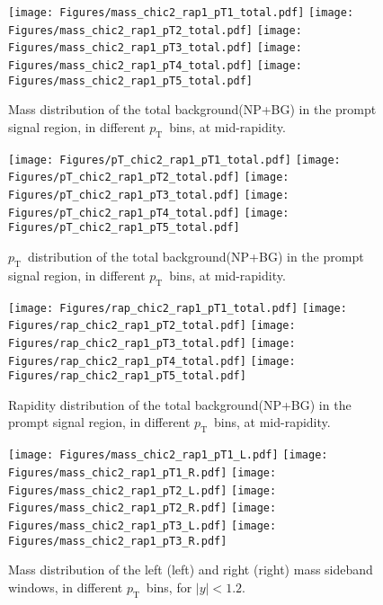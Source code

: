 \documentclass[12pt]{article}
\newcommand{\pt}{$p_{\mathrm{T}}$}
\begin{document}
\begin{figure}[htbp]
\centering
\texttt{[image: Figures/mass\_chic2\_rap1\_pT1\_total.pdf]}
\texttt{[image: Figures/mass\_chic2\_rap1\_pT2\_total.pdf]}
\texttt{[image: Figures/mass\_chic2\_rap1\_pT3\_total.pdf]}
\texttt{[image: Figures/mass\_chic2\_rap1\_pT4\_total.pdf]}
\texttt{[image: Figures/mass\_chic2\_rap1\_pT5\_total.pdf]}
\caption{Mass distribution of the total
  background(NP+BG) in the prompt signal region,
   in different \pt\ bins, at mid-rapidity.}
\end{figure}
\clearpage

\begin{figure}[htbp]
\centering
\texttt{[image: Figures/pT\_chic2\_rap1\_pT1\_total.pdf]}
\texttt{[image: Figures/pT\_chic2\_rap1\_pT2\_total.pdf]}
\texttt{[image: Figures/pT\_chic2\_rap1\_pT3\_total.pdf]}
\texttt{[image: Figures/pT\_chic2\_rap1\_pT4\_total.pdf]}
\texttt{[image: Figures/pT\_chic2\_rap1\_pT5\_total.pdf]}
\caption{\pt\ distribution of the total
  background(NP+BG) in the prompt signal region,
   in different \pt\ bins, at mid-rapidity.}
\end{figure}
\clearpage

\begin{figure}[htbp]
\centering
\texttt{[image: Figures/rap\_chic2\_rap1\_pT1\_total.pdf]}
\texttt{[image: Figures/rap\_chic2\_rap1\_pT2\_total.pdf]}
\texttt{[image: Figures/rap\_chic2\_rap1\_pT3\_total.pdf]}
\texttt{[image: Figures/rap\_chic2\_rap1\_pT4\_total.pdf]}
\texttt{[image: Figures/rap\_chic2\_rap1\_pT5\_total.pdf]}
\caption{Rapidity distribution of the total
  background(NP+BG) in the prompt signal region,
   in different \pt\ bins, at mid-rapidity.}
\end{figure}
\clearpage


\begin{figure}[htbp]
\centering
\texttt{[image: Figures/mass\_chic2\_rap1\_pT1\_L.pdf]}
\texttt{[image: Figures/mass\_chic2\_rap1\_pT1\_R.pdf]}
\texttt{[image: Figures/mass\_chic2\_rap1\_pT2\_L.pdf]}
\texttt{[image: Figures/mass\_chic2\_rap1\_pT2\_R.pdf]}
\texttt{[image: Figures/mass\_chic2\_rap1\_pT3\_L.pdf]}
\texttt{[image: Figures/mass\_chic2\_rap1\_pT3\_R.pdf]}
\caption{Mass distribution of the left (left) and
  right (right) mass sideband windows, in different
  \pt\ bins, for $|y| < 1.2$.}
\end{figure}
\clearpage
\end{document}
